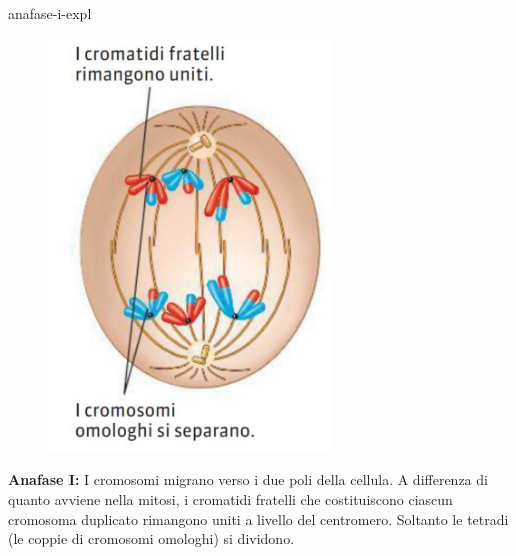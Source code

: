 \documentclass[preview]{standalone}
\begin{document}
\begin{snippet}{anafase-i-expl}
    \setlength{\intextsep}{0pt}%
    \begin{figure}
        \includegraphics[width=7.5cm]{./resources/anafase-i.png}
        \vspace{-1cm}
    \end{figure}

    \textbf{Anafase I:}
    I cromosomi migrano verso i due poli della cellula. A differenza di quanto avviene nella
    mitosi, i cromatidi fratelli che costituiscono ciascun cromosoma duplicato rimangono uniti a
    livello del centromero. Soltanto le tetradi (le coppie di cromosomi omologhi) si dividono.
    \wrapfill
\end{snippet}
\end{document}

